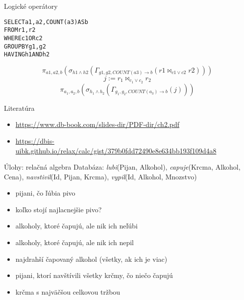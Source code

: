 \documentclass[12pt]{beamer}
\let\o=\vee
\let\a=\wedge
\begin{document}
\begin{frame}[fragile]{Logické operátory}
\begin{alltt}
SELECT a1, a2, COUNT(a3) AS b
FROM r1, r2
WHERE c1 OR c2
GROUP BY g1, g2
HAVING h1 AND h2
\end{alltt}
$$\pi_{a1, a2, b}(\sigma_{h1\a h2}(\Gamma_{g1, g2, COUNT(a3)\rightarrow b} (r1\bowtie_{c1 \o c2} r2)))$$
\bigskip
$$j := r_1\bowtie_{c_1 \o c_2} r_2$$
$$\pi_{a_1, a_2, b}(\sigma_{h_1\a h_2}(\Gamma_{g_1, g_2, COUNT(a_3)\rightarrow b} (j)))$$
\end{frame}

\begin{frame}{Literatúra}
\begin{itemize}
\item {\scriptsize\url{https://www.db-book.com/slides-dir/PDF-dir/ch2.pdf}}
\item {\scriptsize\url{https://dbis-uibk.github.io/relax/calc/gist/379b0fdd72490e8e634bb193f109d4a8}}
\end{itemize}
\end{frame}

\begin{frame}{Úlohy: relačná algebra}
Databáza: \emph{lubi}(Pijan, Alkohol), \emph{capuje}(Krcma, Alkohol, Cena),
\emph{navstivil}(Id, Pijan, Krcma), \emph{vypil}(Id, Alkohol, Mnozstvo)
\begin{itemize}
	\item pijani, čo ľúbia pivo
	\item koľko stojí najlacnejšie pivo?
    \item alkoholy, ktoré čapujú, ale nik ich neľúbi
    \item alkoholy, ktoré čapujú, ale nik ich nepil
	\item najdrahší čapovaný alkohol (všetky, ak ich je viac)
	\item pijani, ktorí navštívili všetky krčmy, čo niečo čapujú
    \item krčma s najväčšou celkovou tržbou
\end{itemize}
\end{frame}
\end{document}
